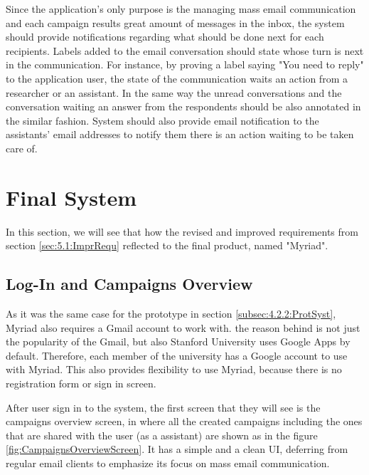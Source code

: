 Since the application's only purpose is the managing mass email communication and each campaign results great amount of messages in the inbox, the system should provide notifications regarding what should be done next for each recipients. Labels added to the email conversation should state whose turn is next in the communication. For instance, by proving a label saying "You need to reply" to the application user, the state of the communication waits an action from a researcher or an assistant. In the same way the unread conversations and the conversation waiting an answer from the respondents should be also annotated in the similar fashion. System should also provide email notification to the assistants' email addresses to notify them there is an action waiting to be taken care of.

\section{Final System}
\label{sec:5.2:FinaSyst}
In this section, we will see that how the revised and improved requirements from section \ref{sec:5.1:ImprRequ} reflected to the final product, named "Myriad".

\subsection{Log-In and Campaigns Overview}
\label{subsec:5.2.1:CampOver}

As it was the same case for the prototype in section \ref{subsec:4.2.2:ProtSyst}, Myriad also requires a Gmail account to work with. the reason behind is not just the popularity of the Gmail, but also Stanford University uses Google Apps by default. Therefore, each member of the university has a Google account to use with Myriad. This also provides flexibility to use Myriad, because there  is no registration form or sign in screen.
\vspace{1cm}

After user sign in to the system, the first screen that they will see is the campaigns overview screen, in where all the created campaigns including the ones that are shared with the user (as a assistant) are shown as in the figure \ref{fig:CampaignsOverviewScreen}. It has a simple and a clean \ac{UI}, deferring from regular email clients to emphasize its focus on mass email communication.

